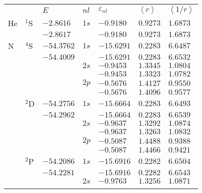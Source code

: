 \begin{table}
\begin{center}
\begin{tabularx}{\textwidth}{
>{\centering\arraybackslash}p{}
>{\centering\arraybackslash}p{}
>{\centering\arraybackslash}p{}
>{\centering\arraybackslash}p{}
>{\centering\arraybackslash}p{}
>{\centering\arraybackslash}p{}
>{\centering\arraybackslash}p{}}
\rowcolor{mydarkgray} 
   & & $E$ & $nl$ & $\varepsilon_{nl}$ & $\left<r\right>$ & $\left<1/r\right>$ \\
He & $^1$S & $-2.8616$   & $1s$ & $-0.9180$  & $0.9273$ & $1.6873$ \\\rowcolor{mygray} 
   &       & $-2.8617$   &      & $-0.9180$  & $0.9273$ & $1.6873$ \\
N  & $^4$S & $-54.3762$  & $1s$ & $-15.6291$ & $0.2283$ & $6.6487$ \\\rowcolor{mygray} 
   &       & $-54.4009$  &      & $-15.6291$ & $0.2283$ & $6.6532$ \\
   &       &             & $2s$ & $-0.9453$  & $1.3345$ & $1.0804$ \\\rowcolor{mygray} 
   &       &             &      & $-0.9453$  & $1.3323$ & $1.0782$ \\
   &       &             & $2p$ & $-0.5676$  & $1.4127$ & $0.9550$ \\\rowcolor{mygray} 
   &       &             &      & $-0.5676$  & $1.4096$ & $0.9577$ \\
   & $^2$D & $-54.2756$  & $1s$ & $-15.6664$ & $0.2283$ & $6.6493$ \\\rowcolor{mygray} 
   &       & $-54.2962$  &      & $-15.6664$ & $0.2283$ & $6.6539$ \\
   &       &             & $2s$ & $-0.9637$  & $1.3292$ & $1.0874$ \\\rowcolor{mygray} 
   &       &             &      & $-0.9637$  & $1.3263$ & $1.0832$ \\
   &       &             & $2p$ & $-0.5087$  & $1.4488$ & $0.9388$ \\\rowcolor{mygray} 
   &       &             &      & $-0.5087$  & $1.4466$ & $0.9421$ \\
   & $^2$P & $-54.2086$  & $1s$ & $-15.6916$ & $0.2282$ & $6.6504$ \\\rowcolor{mygray} 
   &       & $-54.2281$  &      & $-15.6916$ & $0.2282$ & $6.6543$ \\
   &       &             & $2s$ & $-0.9763$  & $1.3256$ & $1.0871$ \\\rowcolor{mygray} 

\end{tabularx}
\end{center}
\end{table}
